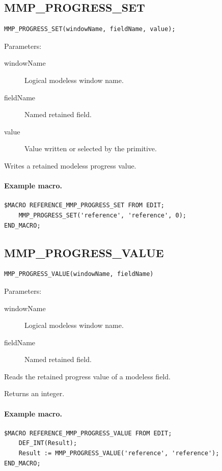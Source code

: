 \documentclass[a4paper,10pt,twoside,openany]{book}
\newenvironment{mrmacextension}{\begin{changebar}}{\end{changebar}}
\begin{document}
\begin{mrmacextension}
\label{prim:procedure-mmp-progress-set}
\subsection*{MMP\_PROGRESS\_SET}
\begin{verbatim}
MMP_PROGRESS_SET(windowName, fieldName, value);
\end{verbatim}
Parameters:
\begin{description}
\item[windowName] Logical modeless window name.
\item[fieldName] Named retained field.
\item[value] Value written or selected by the primitive.
\end{description}

Writes a retained modeless progress value.

\paragraph{Example macro.}
\begin{verbatim}
$MACRO REFERENCE_MMP_PROGRESS_SET FROM EDIT;
    MMP_PROGRESS_SET('reference', 'reference', 0);
END_MACRO;
\end{verbatim}
\end{mrmacextension}

\begin{mrmacextension}
\label{prim:intrinsic-mmp-progress-value}
\subsection*{MMP\_PROGRESS\_VALUE}
\begin{verbatim}
MMP_PROGRESS_VALUE(windowName, fieldName)
\end{verbatim}
Parameters:
\begin{description}
\item[windowName] Logical modeless window name.
\item[fieldName] Named retained field.
\end{description}

Reads the retained progress value of a modeless field.

Returns an integer.

\paragraph{Example macro.}
\begin{verbatim}
$MACRO REFERENCE_MMP_PROGRESS_VALUE FROM EDIT;
    DEF_INT(Result);
    Result := MMP_PROGRESS_VALUE('reference', 'reference');
END_MACRO;
\end{verbatim}
\end{mrmacextension}
\end{document}
